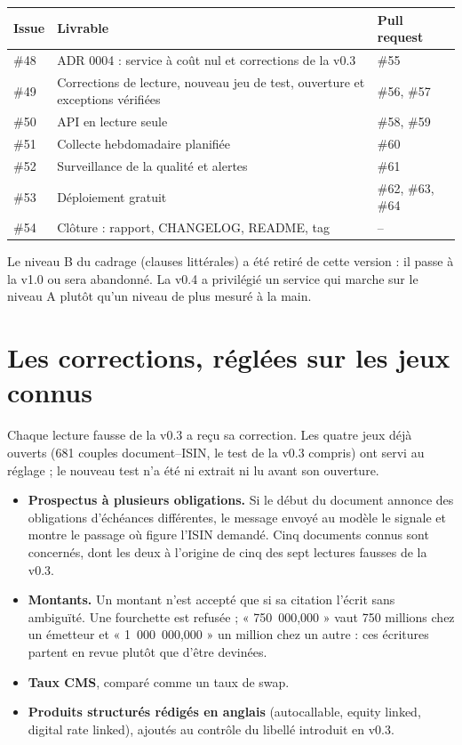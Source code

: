 \documentclass[11pt,a4paper]{article}
\begin{document}
\begin{table}[H]
\small
\begin{tabularx}{\linewidth}{lYl}
\toprule
\textbf{Issue} & \textbf{Livrable} & \textbf{Pull request} \\
\midrule
\#48 & ADR 0004 : service à coût nul et corrections de la v0.3 & \#55 \\
\#49 & Corrections de lecture, nouveau jeu de test, ouverture et exceptions vérifiées & \#56, \#57 \\
\#50 & API en lecture seule & \#58, \#59 \\
\#51 & Collecte hebdomadaire planifiée & \#60 \\
\#52 & Surveillance de la qualité et alertes & \#61 \\
\#53 & Déploiement gratuit & \#62, \#63, \#64 \\
\#54 & Clôture : rapport, CHANGELOG, README, tag & -- \\
\bottomrule
\end{tabularx}
\end{table}

Le niveau B du cadrage (clauses littérales) a été retiré de cette version : il passe à la v1.0 ou sera abandonné. La v0.4 a privilégié un service qui marche sur le niveau A plutôt qu'un niveau de plus mesuré à la main.

\section{Les corrections, réglées sur les jeux connus}

Chaque lecture fausse de la v0.3 a reçu sa correction. Les quatre jeux déjà ouverts (681 couples document--ISIN, le test de la v0.3 compris) ont servi au réglage ; le nouveau test n'a été ni extrait ni lu avant son ouverture.

\begin{itemize}
  \item \textbf{Prospectus à plusieurs obligations.} Si le début du document annonce des obligations d'échéances différentes, le message envoyé au modèle le signale et montre le passage où figure l'ISIN demandé. Cinq documents connus sont concernés, dont les deux à l'origine de cinq des sept lectures fausses de la v0.3.
  \item \textbf{Montants.} Un montant n'est accepté que si sa citation l'écrit sans ambiguïté. Une fourchette est refusée ; « 750~000,000 » vaut 750 millions chez un émetteur et « 1~000~000,000 » un million chez un autre : ces écritures partent en revue plutôt que d'être devinées.
  \item \textbf{Taux CMS}, comparé comme un taux de swap.
  \item \textbf{Produits structurés rédigés en anglais} (autocallable, equity linked, digital rate linked), ajoutés au contrôle du libellé introduit en v0.3.
\end{itemize}
\end{document}

